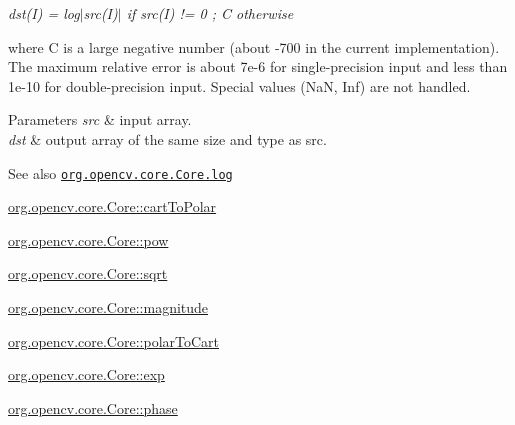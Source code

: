 {\itshape dst(\+I) = log$\vert$src(I)$\vert$ if src(\+I) != 0 ; C otherwise}

where {\ttfamily C} is a large negative number (about -\/700 in the current implementation). The maximum relative error is about {\ttfamily 7e-\/6} for single-\/precision input and less than {\ttfamily 1e-\/10} for double-\/precision input. Special values (NaN, Inf) are not handled.


\begin{DoxyParams}{Parameters}
{\em src} & input array. \\
\hline
{\em dst} & output array of the same size and type as {\ttfamily src}.\\
\hline
\end{DoxyParams}
\begin{DoxySeeAlso}{See also}
\href{http://docs.opencv.org/modules/core/doc/operations_on_arrays.html#log}{\tt org.\+opencv.\+core.\+Core.\+log} 

\mbox{\hyperlink{classorg_1_1opencv_1_1core_1_1_core_a395a53b9bd769978c12c2c19a02ffeae}{org.\+opencv.\+core.\+Core\+::cart\+To\+Polar}} 

\mbox{\hyperlink{classorg_1_1opencv_1_1core_1_1_core_a29c20af97ae09c75246777774bc6d41b}{org.\+opencv.\+core.\+Core\+::pow}} 

\mbox{\hyperlink{classorg_1_1opencv_1_1core_1_1_core_a5a2235761d8876294b3277876479107b}{org.\+opencv.\+core.\+Core\+::sqrt}} 

\mbox{\hyperlink{classorg_1_1opencv_1_1core_1_1_core_ac0195922fb03d6bad195054e615cb4e1}{org.\+opencv.\+core.\+Core\+::magnitude}} 

\mbox{\hyperlink{classorg_1_1opencv_1_1core_1_1_core_a90c17a6d7e194cd8baf45819267a4539}{org.\+opencv.\+core.\+Core\+::polar\+To\+Cart}} 

\mbox{\hyperlink{classorg_1_1opencv_1_1core_1_1_core_a18688b13789043dfaa98161fe663f075}{org.\+opencv.\+core.\+Core\+::exp}} 

\mbox{\hyperlink{classorg_1_1opencv_1_1core_1_1_core_a09f94d89796effb89e2bff15c54b383a}{org.\+opencv.\+core.\+Core\+::phase}} 
\end{DoxySeeAlso}
\mbox{\label{classorg_1_1opencv_1_1core_1_1_core_a51b34caa90fa1c30524b3cb852d840d6}} 
